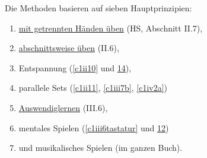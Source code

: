 Die Methoden basieren auf sieben Hauptprinzipien:

\begin{enumerate}[label={\arabic*.}] 
 \item \hyperref[c1ii7]{mit getrennten Händen üben} (HS, Abschnitt II.7),
 \item \hyperref[c1ii6]{abschnittsweise üben} (II.6),
 \item Entspannung (\hyperref[c1ii10]{\autoref{c1ii10}} und \hyperref[c1ii14]{14}),
 \item parallele Sets (\hyperref[c1ii11]{\autoref{c1ii11}}, \hyperref[c1iii7b]{\autoref{c1iii7b}}, \hyperref[c1iv2a]{\autoref{c1iv2a}})
 \item \hyperref[c1iii6]{Auswendiglernen} (III.6),
 \item mentales Spielen (\hyperref[c1iii6tastatur]{\autoref{c1iii6tastatur}} und \hyperref[c1iii12]{12})
 \item und musikalisches Spielen (im ganzen Buch).
 \end{enumerate}
